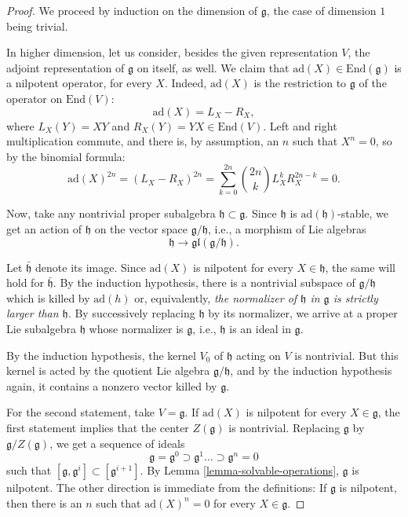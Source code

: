 \begin{proof}
 
We proceed by induction on the dimension of $\mathfrak g$, the case of dimension $1$ being trivial.
 
In higher dimension, let us consider, besides the given representation $V$, the adjoint representation of $\mathfrak g$ on itself, as well. We claim that $\text{ad}(X) \in \text{End}(\mathfrak g)$ is a nilpotent operator, for every $X$. Indeed, $\text{ad}(X)$ is the restriction to $\mathfrak g$ of the operator on $\text{End}(V)$: 
$$ \text{ad}(X) = L_X - R_X,$$
where $L_X(Y) = XY$ and $R_X(Y) = YX \in \text{End}(V)$. Left and right multiplication commute, and there is, by assumption, an $n$ such that $X^n=0$, so by the binomial formula:
$$\text{ad}(X)^{2n} = (L_X - R_X)^{2n} = \sum_{k=0}^{2n} \binom{2n}{k} L_X^k R_X^{2n-k} = 0.$$

Now, take any nontrivial proper subalgebra $\mathfrak h \subset \mathfrak g$. Since $\mathfrak h$ is $\text{ad}(\mathfrak h)$-stable, we get an action of $\mathfrak h$ on the vector space $\mathfrak g/\mathfrak h$, i.e., a morphism of Lie algebras
 $$ \mathfrak h \to \mathfrak{gl}(\mathfrak g/\mathfrak h).$$
 
Let $\bar{\mathfrak h}$ denote its image. Since $\text{ad}(X)$ is nilpotent for every $X\in \mathfrak h$, the same will hold for $\bar{\mathfrak h}$. By the induction hypothesis, there is a nontrivial subspace of $\mathfrak g/\mathfrak h$ which is killed by $\text{ad}(h)$ or, equivalently, \emph{the normalizer of $\mathfrak h$ in $\mathfrak g$ is strictly larger than $\mathfrak h$}. By successively replacing $\mathfrak h$ by its normalizer, we arrive at a proper Lie subalgebra $\mathfrak h$ whose normalizer is $\mathfrak g$, i.e., $\mathfrak h$ is an ideal in $\mathfrak g$.

By the induction hypothesis, the kernel $V_0$ of $\mathfrak h$ acting on $V$ is nontrivial. But this kernel is acted by the quotient Lie algebra $\mathfrak g/\mathfrak h$, and by the induction hypothesis again, it contains a nonzero vector killed by $\mathfrak g$. 

 


For the second statement, take $V=\mathfrak g$. If $\text{ad}(X)$ is nilpotent for every $X \in \mathfrak g$, the first statement implies that the center $Z(\mathfrak g)$ is nontrivial. Replacing $\mathfrak g$ by $\mathfrak g/Z(\mathfrak g)$, we get a sequence of ideals 
$$ \mathfrak g = \mathfrak g^0 \supset \mathfrak g^1 \dots \supset \mathfrak g^n=0$$
such that $[\mathfrak g, \mathfrak g^i]\subset [\mathfrak g^{i+1}]$. By Lemma \ref{lemma-solvable-operations}, $\mathfrak g$ is nilpotent. The other direction is immediate from the definitions: If $\mathfrak g$ is nilpotent, then there is an $n$ such that $\text{ad}(X)^n = 0$ for every $X\in \mathfrak g$.
 
\end{proof}




